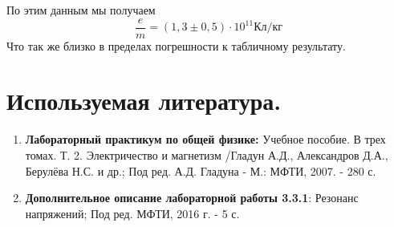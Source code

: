 \documentclass[a4paper, 12pt]{article}%
\begin{document}
По этим данным мы получаем 
\[\dfrac{e}{m} = (1,3 \pm 0,5) \cdot 10^{11} \text{Кл}/\text{кг}\]
Что так же близко в пределах погрешности к табличному результату.
\section*{Используемая литература.}
\begin{enumerate}
\item \textbf{Лабораторный практикум по общей физике:} Учебное пособие. В трех томах. Т. 2. Электричество и магнетизм /Гладун А.Д., Александров Д.А., Берулёва Н.С. и др.; Под ред. А.Д. Гладуна - М.: МФТИ, 2007. - 280 с.
\item \textbf{Дополнительное описание лабораторной работы 3.3.1}: Резонанс напряжений; Под ред. МФТИ, 2016 г. - 5 с.
\end{enumerate}
\end{document}
